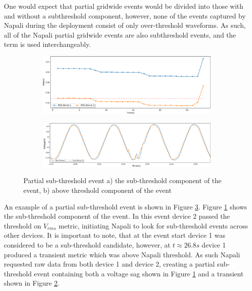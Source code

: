 One would expect that partial gridwide events would be divided into those with and without a subthreshold component,
however, none of the events captured by Napali during the deployment consist of only over-threshold waveforms.
As such, all of the Napali partial gridwide events are also subthreshold events, and the term is used interchangeably.

\begin{figure}[ht!]
    \centering
    \begin{subfigure}{1\textwidth}
        \centering
        \includegraphics[width=1\linewidth]{img/napali_eval/rms_gridwide_subthreshold.pdf}
        \caption{}
        \label{fig:expdes:8:1}
    \end{subfigure}%

    \begin{subfigure}{1\textwidth}
        \centering
        \includegraphics[width=1\linewidth]{img/napali_eval/raw_gridwide_subthreshold_zoom.pdf}
        \caption{}
        \label{fig:expdes:8:2}
    \end{subfigure}
    \caption{Partial sub-threshold event a) the sub-threshold component of the event, b) above threshold component of the event}
    \label{fig:expdes:8}
\end{figure}

An example of a partial sub-threshold event is shown in Figure \ref{fig:expdes:8}.
Figure \ref{fig:expdes:8:1} shows the sub-threshold component of the event.
In this event device 2 passed the threshold on $V_{rms}$ metric, initiating Napali to look for sub-threshold events across other devices.
It is important to note, that at the event start device 1 was considered to be a sub-threshold candidate, however, at $t \approx 26.8s$ device 1 produced a transient metric which was above Napali threshold.
As such Napali requested raw data from both device 1 and device 2, creating a partial sub-threshold event containing both a voltage sag shown in Figure \ref{fig:expdes:8:1} and a transient shown in Figure \ref{fig:expdes:8:2}.

